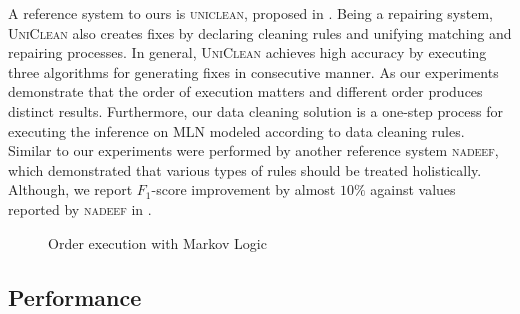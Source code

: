 A reference system to ours is \textsc{uniclean}, proposed in \cite{Fan:2014:IRM:2628135.2567657}. Being a repairing system, \textsc{UniClean} also creates fixes by declaring cleaning rules and unifying matching and repairing processes. In general, \textsc{UniClean} achieves high accuracy by executing three algorithms for generating fixes in consecutive manner. As our experiments demonstrate that the order of execution matters and different order produces distinct results. Furthermore, our data cleaning solution is a one-step process for executing the inference on MLN modeled according to data cleaning rules. Similar to our experiments were performed by another reference system \textsc{nadeef}, which demonstrated that various types of rules should be treated holistically. Although, we report $F_1$-score improvement by almost $10\%$ against values reported by \textsc{nadeef} in \cite{Dallachiesa:2013:NCD:2463676.2465327}.

\begin{figure}
\centering
{}
\caption{Order execution with Markov Logic} 
\label{fig:orderexec}
\end{figure}

\subsection{Performance}

